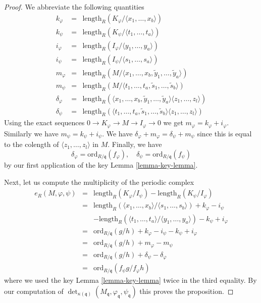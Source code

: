 \begin{proof}
\medskip\noindent
We abbreviate the following quantities
\begin{eqnarray*}
k_\varphi & = & \text{length}_R(K_\varphi/\langle x_1, \ldots, x_b\rangle) \\
k_\psi    & = & \text{length}_R(K_\psi/\langle t_1, \ldots, t_a\rangle) \\
i_\varphi & = & \text{length}_R(I_\varphi/\langle y_1, \ldots, y_a\rangle) \\
i_\psi    & = & \text{length}_R(I_\psi/\langle s_1, \ldots, s_a\rangle) \\
m_\varphi & = & \text{length}_R(M/
\langle x_1, \ldots, x_b, \tilde y_1, \ldots, \tilde y_a\rangle) \\
m_\psi    & = & \text{length}_R(M/
\langle t_1, \ldots, t_a, \tilde s_1, \ldots, \tilde s_b\rangle) \\
\delta_\varphi & = & \text{length}_R(
\langle x_1, \ldots, x_b, \tilde y_1, \ldots, \tilde y_a\rangle
\langle z_1, \ldots, z_l\rangle) \\
\delta_\psi & = & \text{length}_R(
\langle t_1, \ldots, t_a, \tilde s_1, \ldots, \tilde s_b\rangle
\langle z_1, \ldots, z_l\rangle)
\end{eqnarray*}
Using the exact sequences $0 \to K_\varphi \to M \to I_\varphi \to 0$
we get $m_\varphi = k_\varphi + i_\varphi$. Similarly we have
$m_\psi = k_\psi + i_\psi$. We have
$\delta_\varphi + m_\varphi = \delta_\psi + m_\psi$ since this
is equal to the colength of $\langle z_1, \ldots, z_l \rangle$
in $M$. Finally, we have
$$
\delta_\varphi = \text{ord}_{R/\mathfrak q}(f_\varphi),
\quad
\delta_\psi = \text{ord}_{R/\mathfrak q}(f_\psi)
$$
by our first application of the key Lemma \ref{lemma-key-lemma}.

\medskip\noindent
Next, let us compute the multiplicity of the periodic complex
\begin{eqnarray*}
e_R(M, \varphi, \psi) & = &
\text{length}_R(K_\varphi/I_\psi) - \text{length}_R(K_\psi/I_\varphi) \\
& = &
\text{length}_R(
\langle x_1, \ldots, x_b\rangle/
\langle s_1, \ldots, s_b\rangle)
+ k_\varphi - i_\psi \\
& & -
\text{length}_R(
\langle t_1, \ldots, t_a\rangle/
\langle y_1, \ldots, y_a\rangle)
- k_\psi + i_\varphi \\
& = &
\text{ord}_{R/\mathfrak q}(g/h) + k_\varphi - i_\psi - k_\psi + i_\varphi \\
& = &
\text{ord}_{R/\mathfrak q}(g/h) + m_\varphi - m_\psi \\
& = &
\text{ord}_{R/\mathfrak q}(g/h) + \delta_\psi - \delta_\varphi \\
& = &
\text{ord}_{R/\mathfrak q}(f_\psi g/f_\varphi h)
\end{eqnarray*}
where we used the key Lemma \ref{lemma-key-lemma} twice in the third equality.
By our computation of $\det_{\kappa(\mathfrak q)}
(M_{\mathfrak q}, \varphi_{\mathfrak q}, \psi_{\mathfrak q})$
this proves the proposition.
\end{proof}

